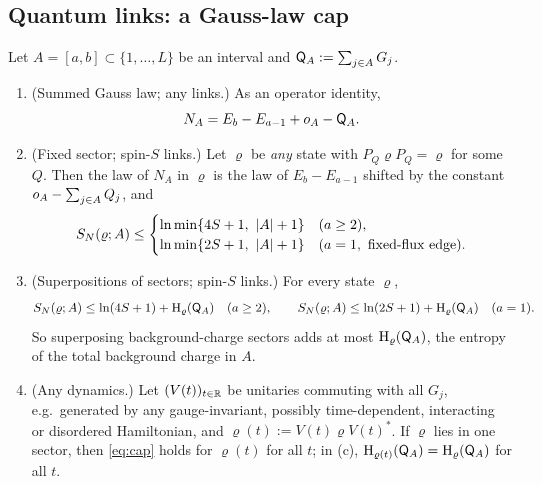 \subsection{Quantum links: a Gauss-law cap}\label{sec:u1:qlm}

\begin{proposition}\label{prop:gausscap}
Let $A=[a,b]\subset\{1,\dots,L\}$ be an interval and $\mathsf{Q}_A:=\sum_{j\in A}G_j$.
\begin{enumerate}[label=(\alph*)]
\item (Summed Gauss law; any links.)  As an operator identity,
\begin{equation}\label{eq:summedgauss}
  N_A=E_b-E_{a-1}+o_A-\mathsf{Q}_A .
\end{equation}
\item (Fixed sector; spin-$S$ links.)  Let $\varrho$ be \emph{any} state with $P_Q\varrho P_Q=\varrho$ for some $Q$.  Then the
law of $N_A$ in $\varrho$ is the law of $E_b-E_{a-1}$ shifted by the constant $o_A-\sum_{j\in A}Q_j$, and
\begin{equation}\label{eq:cap}
  S_{N}(\varrho;A)\le
  \begin{cases}
    \ln\min\{4S+1,\ \left|A\right|+1\} & (a\ge2),\\
    \ln\min\{2S+1,\ \left|A\right|+1\} & (a=1,\ \text{fixed-flux edge}).
  \end{cases}
\end{equation}
\item (Superpositions of sectors; spin-$S$ links.)  For every state $\varrho$,
\[
  S_{N}(\varrho;A)\le\ln(4S+1)+\mathrm{H}_\varrho(\mathsf{Q}_A)\quad(a\ge2),\qquad
  S_{N}(\varrho;A)\le\ln(2S+1)+\mathrm{H}_\varrho(\mathsf{Q}_A)\quad(a=1).
\]
So superposing background-charge sectors adds at most $\mathrm{H}_\varrho(\mathsf{Q}_A)$, the entropy of the total background charge in $A$.
\item (Any dynamics.)  Let $(V(t))_{t\in\mathbb{R}}$ be unitaries commuting with all $G_j$, e.g.\ generated by any
gauge-invariant, possibly time-dependent, interacting or disordered Hamiltonian, and $\varrho(t):=V(t)\varrho V(t)^*$.
If $\varrho$ lies in one sector, then \eqref{eq:cap} holds for $\varrho(t)$ for all $t$; in (c),
$\mathrm{H}_{\varrho(t)}(\mathsf{Q}_A)=\mathrm{H}_\varrho(\mathsf{Q}_A)$ for all $t$.
\end{enumerate}
\end{proposition}

